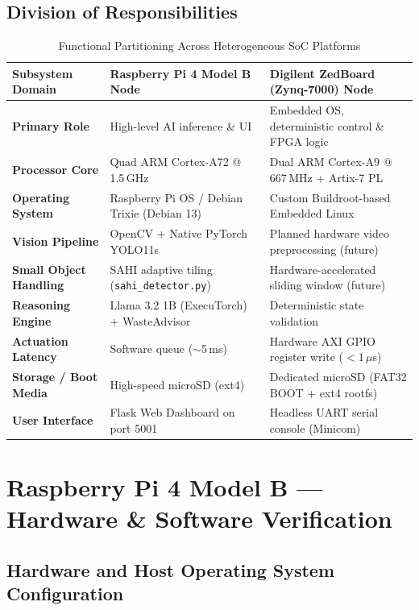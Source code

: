 \documentclass[12pt,a4paper]{article}
\begin{document}
\subsection{Division of Responsibilities}

\begin{table}[H]
\centering
\caption{Functional Partitioning Across Heterogeneous SoC Platforms}\label{tab:hw_partition}
\begin{tabular}{lll}
\toprule
\textbf{Subsystem Domain} & \textbf{Raspberry Pi 4 Model B Node} & \textbf{Digilent ZedBoard (Zynq-7000) Node} \\
\midrule
\textbf{Primary Role}
  & High-level AI inference \& UI
  & Embedded OS, deterministic control \& FPGA logic \\
\textbf{Processor Core}
  & Quad ARM Cortex-A72 @ 1.5\,GHz
  & Dual ARM Cortex-A9 @ 667\,MHz + Artix-7 PL \\
\textbf{Operating System}
  & Raspberry Pi OS / Debian Trixie (Debian 13)
  & Custom Buildroot-based Embedded Linux \\
\textbf{Vision Pipeline}
  & OpenCV + Native PyTorch YOLO11s
  & Planned hardware video preprocessing (future) \\
\textbf{Small Object Handling}
  & SAHI adaptive tiling (\texttt{sahi\_detector.py})
  & Hardware-accelerated sliding window (future) \\
\textbf{Reasoning Engine}
  & Llama 3.2 1B (ExecuTorch) + WasteAdvisor
  & Deterministic state validation \\
\textbf{Actuation Latency}
  & Software queue ($\sim$5\,ms)
  & Hardware AXI GPIO register write ($<1\,\mu$s) \\
\textbf{Storage / Boot Media}
  & High-speed microSD (ext4)
  & Dedicated microSD (FAT32 BOOT + ext4 rootfs) \\
\textbf{User Interface}
  & Flask Web Dashboard on port 5001
  & Headless UART serial console (Minicom) \\
\bottomrule
\end{tabular}
\end{table}

\clearpage

\section{Raspberry Pi 4 Model B — Hardware \& Software Verification}

\subsection{Hardware and Host Operating System Configuration}
\end{document}
